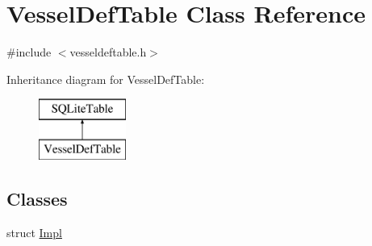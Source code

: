 \hypertarget{class_vessel_def_table}{}\section{Vessel\+Def\+Table Class Reference}
\label{class_vessel_def_table}


{\ttfamily \#include $<$vesseldeftable.\+h$>$}

Inheritance diagram for Vessel\+Def\+Table\+:\begin{figure}[H]
\begin{center}
\leavevmode
\includegraphics[height=2.000000cm]{d0/dcf/class_vessel_def_table}
\end{center}
\end{figure}
\subsection*{Classes}
\begin{DoxyCompactItemize}
\item 
struct \mbox{\hyperlink{struct_vessel_def_table_1_1_impl}{Impl}}
\end{DoxyCompactItemize}

